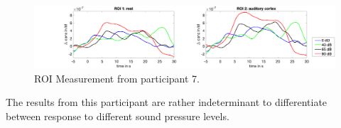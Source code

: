 \begin{figure}[H]
  \centering
    \includegraphics[scale=.29]{bilder/ROI/sub_liao_s_HbO.png}
  \caption{ROI Measurement from participant 7.}
\end{figure}

The results from this participant are rather indeterminant to differentiate between response to different sound pressure levels.

\newpage









